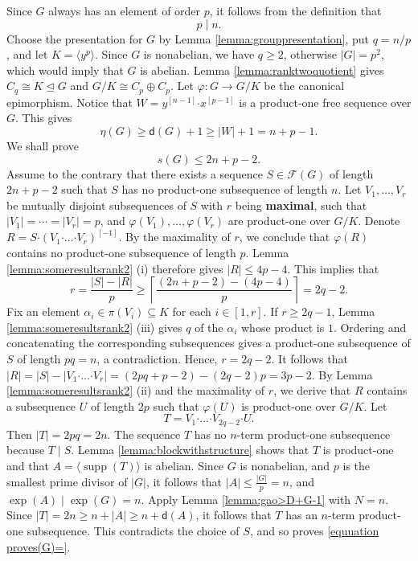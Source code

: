 \documentclass[a4paper, 12pt]{article}
\theoremstyle{definition}
\DeclareMathOperator{\supp}{supp}
\begin{document}
Since $G$ always has an element of order $p$, it follows from the definition that $$p\mid n.$$
Choose the presentation for $G$
by Lemma \ref{lemma:grouppresentation}, put $q=n/p$, and let
$K=\langle y^p\rangle$.  Since $G$ is nonabelian, we have $q\geq 2$, otherwise $|G|=p^2$, which
would imply that $G$ is abelian. Lemma \ref{lemma:ranktwoquotient} gives
$C_q\cong K\unlhd G$ and
$G/K\cong C_p\oplus C_p.$ Let $\varphi:G\to G/K$ be the canonical epimorphism.
Notice that
$W=y^{[n-1]}\boldsymbol{\cdot}x^{[p-1]}$
is a product-one free sequence over $G$. This gives
\begin{equation}\label{equation eta(G)geq}
\eta(G)\geq \mathsf d(G)+1\geq |W|+1=n+p-1.
\end{equation}
We shall prove
\begin{equation}\label{equuation proves(G)=}
s(G)\leq2n+p-2.
\end{equation}
Assume to the contrary that there exists a sequence $S\in \mathcal{F}(G)$ of length $2n+p-2$ such that $S$ has no product-one subsequence of length $n$.
Let $V_1,\ldots,V_r$ be mutually disjoint subsequences of $S$ with $r$ being {\bf maximal}, such that $|V_1|=\cdots=|V_r|=p$, and $\varphi(V_1),\ldots,\varphi(V_r)$ are product-one over $G/K$. Denote $R=S\boldsymbol{\cdot} (V_1\boldsymbol{\cdot}\ldots\boldsymbol{\cdot} V_r)^{[-1]}.$
By the maximality of $r$, we conclude that $\varphi(R)$ contains no product-one subsequence of length $p$.
Lemma \ref{lemma:someresultsrank2} (i) therefore gives
$|R|\leq4p-4.$
This implies that $$r=\frac{|S|-|R|}{p}\geq  \left\lceil\frac{(2n+p-2)-(4p-4)}{p}\right\rceil=2q-2.$$
Fix an element $\alpha_i\in\pi(V_i)\subseteq K$ for each $i\in [1,r]$.  If
$r\geq2q-1$, Lemma \ref{lemma:someresultsrank2} (iii) gives $q$ of
the $\alpha_i$ whose product is $1$.  Ordering and concatenating the
corresponding subsequences gives a product-one subsequence of $S$ of length
$pq=n$, a contradiction.  Hence,
$r=2q-2.$
It follows that
$|R|=|S|-|V_1\boldsymbol{\cdot} \ldots\boldsymbol{\cdot} V_{r}|=(2pq+p-2)-(2q-2)p=3p-2.$
By Lemma \ref{lemma:someresultsrank2} (ii) and the maximality of $r$, we derive that $R$ contains a subsequence $U$ of length $2p$ such that $\varphi(U)$ is product-one over $G/K$.
Let
$$T=V_1\boldsymbol{\cdot}\ldots
\boldsymbol{\cdot}V_{2q-2}\boldsymbol{\cdot}U.$$
Then $|T|=2pq=2n$.  The sequence $T$ has no $n$-term product-one
subsequence because $T\mid S$.  Lemma \ref{lemma:blockwithstructure} shows
that $T$ is product-one and that $A=\langle\supp(T)\rangle$
is abelian. Since $G$ is nonabelian, and $p$ is the smallest prime divisor of $|G|$, it follows that $|A|\leq \frac{|G|}{p}=n$, and
$\exp(A)\mid\exp(G)=n$.  Apply Lemma \ref{lemma:gao>D+G-1} with
$N=n$.  Since $|T|=2n\geq n+|A|\geq  n+\mathsf d(A)$, it follows that $T$ has an $n$-term product-one subsequence. This
contradicts the choice of $S$, and so proves \eqref{equuation proves(G)=}.
\end{document}
